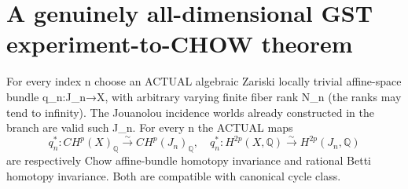 \documentclass[11pt]{article}
\begin{document}
\section{A genuinely all-dimensional GST experiment-to-CHOW theorem}
For every index n choose an ACTUAL
algebraic Zariski locally trivial
affine-space bundle q_n:J_n→X,
with arbitrary varying finite fiber
rank N_n (the ranks may tend
to infinity). The Jouanolou
incidence worlds already constructed
in the branch are valid such J_n.
For every n the ACTUAL maps
\[
 q_n^*:CH^p(X)_\mathbb Q
 \overset{\sim}{\longrightarrow}
 CH^p(J_n)_\mathbb Q,\quad
 q_n^*:H^{2p}(X,\mathbb Q)
 \overset{\sim}{\longrightarrow}
 H^{2p}(J_n,\mathbb Q)                      \tag{2}
\]
are respectively Chow affine-bundle
homotopy invariance and rational Betti
homotopy invariance. Both are
compatible with canonical cycle class.
\end{document}
